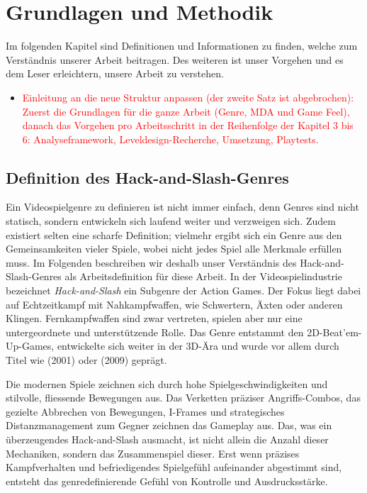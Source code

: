 \documentclass[../Main.tex]{subfiles}
\begin{document}
\section{Grundlagen und Methodik} \label{sec:Grundlagen}
Im folgenden Kapitel sind Definitionen und Informationen zu finden, welche zum Verständnis unserer Arbeit beitragen. Des weiteren ist unser Vorgehen  und es dem Leser erleichtern, unsere Arbeit zu verstehen.

\begin{itemize}[leftmargin=1.5cm]
    \item \textcolor{red}{Einleitung an die neue Struktur anpassen (der zweite Satz ist abgebrochen): Zuerst die Grundlagen für die ganze Arbeit (Genre, MDA und Game Feel), danach das Vorgehen pro Arbeitsschritt in der Reihenfolge der Kapitel 3 bis 6: Analyseframework, Leveldesign-Recherche, Umsetzung, Playtests.}
\end{itemize}

\subsection{Definition des Hack-and-Slash-Genres} \label{sec:Genredefinition}
Ein Videospielgenre zu definieren ist nicht immer einfach, denn Genres sind nicht statisch, sondern entwickeln sich laufend weiter und verzweigen sich. Zudem existiert selten eine scharfe Definition; vielmehr ergibt sich ein Genre aus den Gemeinsamkeiten vieler Spiele, wobei nicht jedes Spiel alle Merkmale erfüllen muss. Im Folgenden beschreiben wir deshalb unser Verständnis des Hack-and-Slash-Genres als Arbeitsdefinition für diese Arbeit. In der Videospielindustrie bezeichnet \textit{Hack-and-Slash} ein Subgenre der Action Games.\autocite{wikipedia_hackandslash} Der Fokus liegt dabei auf Echtzeitkampf mit Nahkampfwaffen, wie Schwertern, Äxten oder anderen Klingen. Fernkampfwaffen sind zwar vertreten, spielen aber nur eine untergeordnete und unterstützende Rolle. Das Genre entstammt den 2D-Beat'em-Up-Games, entwickelte sich weiter in der 3D-Ära und wurde vor allem durch Titel wie  (2001)\autocite{wikipedia_devilmaycry} oder  (2009)\autocite{wikipedia_bayonetta} geprägt.

Die modernen Spiele zeichnen sich durch hohe Spielgeschwindigkeiten und stilvolle, fliessende Bewegungen aus. Das Verketten präziser Angriffs-Combos, das gezielte Abbrechen von Bewegungen, I-Frames und strategisches Distanzmanagement zum Gegner zeichnen das Gameplay aus. Das, was ein überzeugendes Hack-and-Slash ausmacht, ist nicht allein die Anzahl dieser Mechaniken, sondern das Zusammenspiel dieser. Erst wenn präzises Kampfverhalten und befriedigendes Spielgefühl aufeinander abgestimmt sind, entsteht das genredefinierende Gefühl von Kontrolle und Ausdrucksstärke.\autocite[s.5-s.7]{lindgren2025striking}
\end{document}
